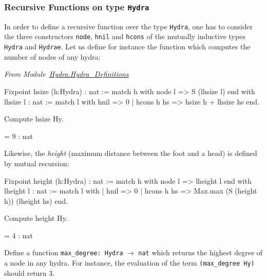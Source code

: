 \subsubsection{Recursive Functions on type \texttt{Hydra}}
\label{sec:orgheadline41}
\label{sec:hsize-def}




In order to  define a recursive function over the type \texttt{Hydra}, one has to consider the three constructors 
\texttt{node}, \texttt{hnil} and \texttt{hcons} of the mutually inductive types \texttt{Hydra} and \texttt{Hydrae}. 
Let us define for instance the function which  computes the number of nodes of any hydra:

\vspace{4pt}
\noindent
\emph{From Module~\href{../theories/html/hydras.Hydra.Hydra_Definitions.html}{Hydra.Hydra\_Definitions}}


\begin{Coqsrc}
Fixpoint hsize (h:Hydra) : nat :=
  match h with node l => S (lhsize l)
  end
with lhsize l : nat :=
  match l with hnil => 0
            | hcons h hs => hsize h + lhsize hs 
  end.

 Compute hsize Hy.
\end{Coqsrc}

\begin{Coqanswer}
 = 9
     : nat 
\end{Coqanswer}


Likewise, the \emph{height} (maximum distance between the foot and a head) 
is defined by mutual recursion:

\begin{Coqsrc}
Fixpoint height  (h:Hydra) : nat :=
  match h with node l => lheight l
  end
with lheight l : nat :=
  match l with 
  | hnil => 0
  | hcons h hs => Max.max (S (height h)) (lheight hs)
  end.
\end{Coqsrc}

\begin{Coqsrc}
Compute height Hy.
\end{Coqsrc}

\begin{Coqanswer}
 = 4
     : nat  
\end{Coqanswer}


\begin{exercise}
Define a function \texttt{max\_degree: Hydra $\mbox{$\rightarrow$}$ nat} which  returns the highest degree of a node in any hydra. For instance, the evaluation of the term \texttt{(max\_degree Hy)} should return $3$.
\end{exercise}

